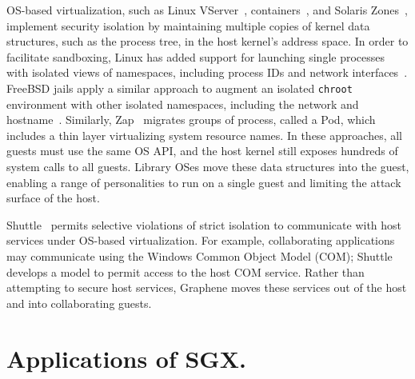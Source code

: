 
OS-based virtualization, such as 
Linux VServer~\citep{vserver},  containers~\citep{bhattiprolu08containers},
and Solaris Zones~\citep{price04zones},
implement security isolation by maintaining multiple copies of kernel data structures,
such as the process tree,
in the host kernel's address space.
In order to facilitate sandboxing, 
Linux has added support for launching single processes
with isolated views of namespaces, including process IDs and network interfaces~\citep{lwn-namespaces}.
FreeBSD jails apply a similar approach to augment an isolated {\tt chroot} environment
with other isolated namespaces, including the network and hostname~\citep{jails}.
Similarly, Zap~\citep{osman02zap} migrates groups of process, called a Pod,
which includes a thin layer virtualizing system resource names.
In these approaches, all guests must use the same OS API, and the host kernel
still exposes hundreds of system calls to all guests.
Library OSes move these data structures into the guest, enabling
a range of personalities to run on a single guest and limiting the attack surface
of the host.


Shuttle~\citep{shan12shuttle} permits selective violations of strict isolation
to communicate with host services 
under OS-based virtualization.
For example, collaborating applications may communicate using the Windows Common Object Model (COM);
Shuttle develops a model to permit access to the host COM service.
Rather than attempting to secure host services,
Graphene moves these services out of the host
and into collaborating guests.



\section{Applications of SGX.}

